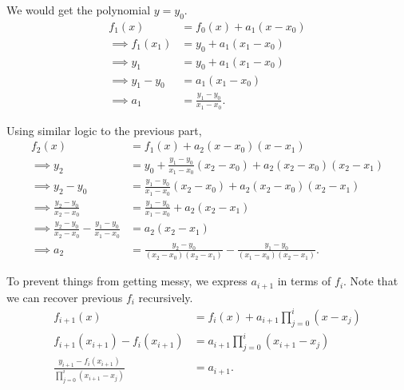 \documentclass[11pt]{article}
\begin{document}
\begin{solution}
    \begin{Parts}
        \Part 
        We would get the polynomial $y = y_0$.
        \Part
        \begin{align*}
            f_1(x) &= f_0(x) + a_1(x-x_0) \\
            \implies f_1(x_1) &= y_0 + a_1(x_1-x_0) \\
            \implies y_1 &= y_0 + a_1(x_1-x_0) \\
            \implies y_1 - y_0 &= a_1(x_1-x_0) \\
            \implies a_1 &= \boxed{\frac{y_1 - y_0}{x_1 - x_0}}.
        \end{align*}
        
        \Part 
        Using similar logic to the previous part,
        \begin{align*}
            f_2(x) &= f_1(x) + a_2(x-x_0)(x-x_1) \\
            \implies y_2 &= y_0 + \frac{y_1 - y_0}{x_1 - x_0} \left(x_2 - x_0\right) + a_2(x_2 - x_0)(x_2 - x_1) \\
            \implies y_2 - y_0 &= \frac{y_1 - y_0}{x_1 - x_0} \left(x_2 - x_0\right) + a_2(x_2 - x_0)(x_2 - x_1) \\
            \implies \frac{y_2 - y_0}{x_2 - x_0} &= \frac{y_1 - y_0}{x_1 - x_0} + a_2(x_2 - x_1) \\
            \implies \frac{y_2 - y_0}{x_2 - x_0} - \frac{y_1 - y_0}{x_1 - x_0} &= a_2(x_2 - x_1) \\
            \implies a_2 &= \boxed{\frac{y_2 - y_0}{(x_2 - x_0)(x_2 - x_1)} - \frac{y_1 - y_0}{(x_1 - x_0)(x_2 - x_1)}}.
        \end{align*}
        
        \Part To prevent things from getting messy, we express $a_{i+1}$ in terms of $f_i$. Note that we can recover previous $f_i$ recursively.
        \begin{align*}
            f_{i+1}(x) &= f_i(x) + a_{i+1} \prod_{j=0}^i (x - x_j) \\
            f_{i+1}(x_{i+1}) - f_i(x_{i+1}) &= a_{i+1} \prod_{j=0}^i (x_{i+1} - x_j) \\
            \boxed{\frac{y_{i+1} - f_i(x_{i+1})}{\prod_{j=0}^i (x_{i+1} - x_j)}} &= a_{i+1}.
        \end{align*}
    \end{Parts}
\end{solution}

\newpage
{}
\end{document}
